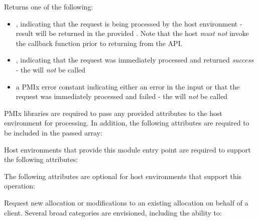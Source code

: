 Returns one of the following:

\begin{itemize}
    \item {}, indicating that the request is being processed by the host environment - result will be returned in the provided . Note that the host \emph{must not} invoke the callback function prior to returning from the \ac{API}.
    \item {}, indicating that the request was immediately processed and returned \textit{success} - the  will \textit{not} be called
    \item a PMIx error constant indicating either an error in the input or that the request was immediately processed and failed - the  will \textit{not} be called
\end{itemize}

\reqattrstart
\ac{PMIx} libraries are required to pass any provided attributes to the host environment for processing. In addition, the following attributes are required to be included in the passed  array:


\divider

Host environments that provide this module entry point are required to support the following attributes:


\reqattrend

\optattrstart
The following attributes are optional for host environments that support this operation:


\optattrend

\descr

Request new allocation or modifications to an existing allocation on behalf of a client. Several broad categories are envisioned, including the ability to:

